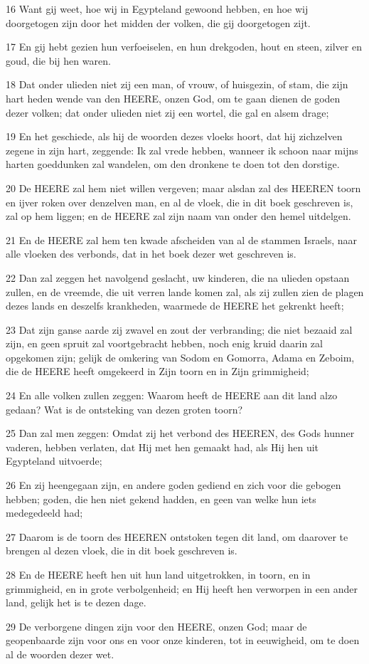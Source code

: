 \par 16 Want gij weet, hoe wij in Egypteland gewoond hebben, en hoe wij doorgetogen zijn door het midden der volken, die gij doorgetogen zijt.
\par 17 En gij hebt gezien hun verfoeiselen, en hun drekgoden, hout en steen, zilver en goud, die bij hen waren.
\par 18 Dat onder ulieden niet zij een man, of vrouw, of huisgezin, of stam, die zijn hart heden wende van den HEERE, onzen God, om te gaan dienen de goden dezer volken; dat onder ulieden niet zij een wortel, die gal en alsem drage;
\par 19 En het geschiede, als hij de woorden dezes vloeks hoort, dat hij zichzelven zegene in zijn hart, zeggende: Ik zal vrede hebben, wanneer ik schoon naar mijns harten goeddunken zal wandelen, om den dronkene te doen tot den dorstige.
\par 20 De HEERE zal hem niet willen vergeven; maar alsdan zal des HEEREN toorn en ijver roken over denzelven man, en al de vloek, die in dit boek geschreven is, zal op hem liggen; en de HEERE zal zijn naam van onder den hemel uitdelgen.
\par 21 En de HEERE zal hem ten kwade afscheiden van al de stammen Israels, naar alle vloeken des verbonds, dat in het boek dezer wet geschreven is.
\par 22 Dan zal zeggen het navolgend geslacht, uw kinderen, die na ulieden opstaan zullen, en de vreemde, die uit verren lande komen zal, als zij zullen zien de plagen dezes lands en deszelfs krankheden, waarmede de HEERE het gekrenkt heeft;
\par 23 Dat zijn ganse aarde zij zwavel en zout der verbranding; die niet bezaaid zal zijn, en geen spruit zal voortgebracht hebben, noch enig kruid daarin zal opgekomen zijn; gelijk de omkering van Sodom en Gomorra, Adama en Zeboim, die de HEERE heeft omgekeerd in Zijn toorn en in Zijn grimmigheid;
\par 24 En alle volken zullen zeggen: Waarom heeft de HEERE aan dit land alzo gedaan? Wat is de ontsteking van dezen groten toorn?
\par 25 Dan zal men zeggen: Omdat zij het verbond des HEEREN, des Gods hunner vaderen, hebben verlaten, dat Hij met hen gemaakt had, als Hij hen uit Egypteland uitvoerde;
\par 26 En zij heengegaan zijn, en andere goden gediend en zich voor die gebogen hebben; goden, die hen niet gekend hadden, en geen van welke hun iets medegedeeld had;
\par 27 Daarom is de toorn des HEEREN ontstoken tegen dit land, om daarover te brengen al dezen vloek, die in dit boek geschreven is.
\par 28 En de HEERE heeft hen uit hun land uitgetrokken, in toorn, en in grimmigheid, en in grote verbolgenheid; en Hij heeft hen verworpen in een ander land, gelijk het is te dezen dage.
\par 29 De verborgene dingen zijn voor den HEERE, onzen God; maar de geopenbaarde zijn voor ons en voor onze kinderen, tot in eeuwigheid, om te doen al de woorden dezer wet.


